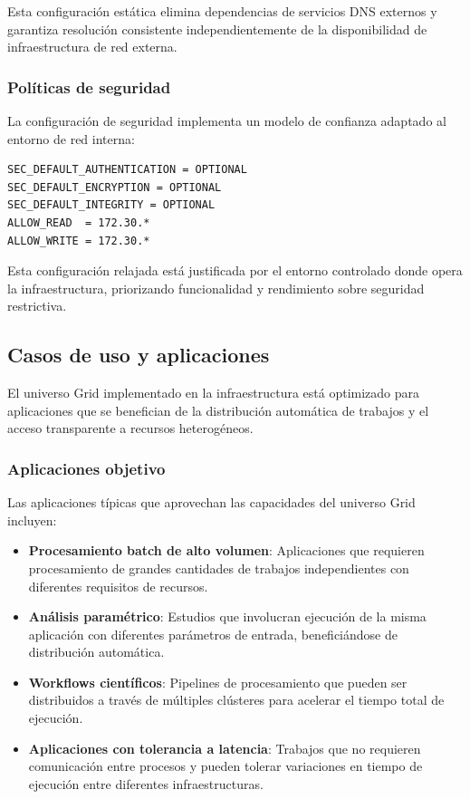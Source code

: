 Esta configuración estática elimina dependencias de servicios DNS externos y garantiza resolución consistente independientemente de la disponibilidad de infraestructura de red externa.

\subsubsection{Políticas de seguridad}
\noindent

La configuración de seguridad implementa un modelo de confianza adaptado al entorno de red interna:

\begin{verbatim}
SEC_DEFAULT_AUTHENTICATION = OPTIONAL
SEC_DEFAULT_ENCRYPTION = OPTIONAL
SEC_DEFAULT_INTEGRITY = OPTIONAL
ALLOW_READ  = 172.30.*
ALLOW_WRITE = 172.30.*
\end{verbatim}

Esta configuración relajada está justificada por el entorno controlado donde opera la infraestructura, priorizando funcionalidad y rendimiento sobre seguridad restrictiva.

\subsection{Casos de uso y aplicaciones}
\noindent

El universo Grid implementado en la infraestructura \GRID está optimizado para aplicaciones que se benefician de la distribución automática de trabajos y el acceso transparente a recursos heterogéneos.

\subsubsection{Aplicaciones objetivo}
\noindent

Las aplicaciones típicas que aprovechan las capacidades del universo Grid incluyen:

\begin{itemize}
	\item \textbf{Procesamiento batch de alto volumen}: Aplicaciones que requieren procesamiento de grandes cantidades de trabajos independientes con diferentes requisitos de recursos.
	
	\item \textbf{Análisis paramétrico}: Estudios que involucran ejecución de la misma aplicación con diferentes parámetros de entrada, beneficiándose de distribución automática.
	
	\item \textbf{Workflows científicos}: Pipelines de procesamiento que pueden ser distribuidos a través de múltiples clústeres para acelerar el tiempo total de ejecución.
	
	\item \textbf{Aplicaciones con tolerancia a latencia}: Trabajos que no requieren comunicación entre procesos y pueden tolerar variaciones en tiempo de ejecución entre diferentes infraestructuras.
\end{itemize}

